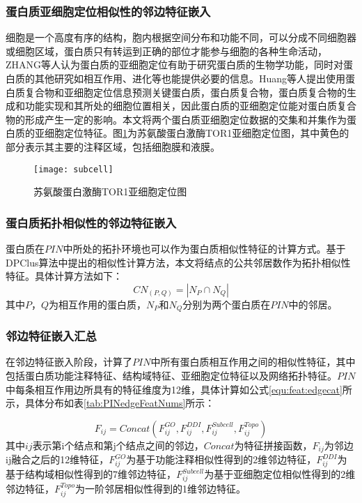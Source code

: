 \subsubsection{蛋白质亚细胞定位相似性的邻边特征嵌入}

细胞是一个高度有序的结构，胞内根据空间分布和功能不同，可以分成不同细胞器或细胞区域，蛋白质只有转运到正确的部位才能参与细胞的各种生命活动，ZHANG等人\cite{zhang_protein_2007}认为蛋白质的亚细胞定位有助于研究蛋白质的生物学功能，同时对蛋白质的其他研究如相互作用、进化等也能提供必要的信息。Huang等人提出\cite{fan_genome-wide_2017}使用蛋白质复合物和亚细胞定位信息预测关键蛋白质，蛋白质复合物，蛋白质复合物的生成和功能实现和其所处的细胞位置相关，因此蛋白质的亚细胞定位能对蛋白质复合物的形成产生一定的影响。本文将两个蛋白质亚细胞定位数据的交集和并集作为蛋白质的亚细胞定位特征。图\ref{fig:subcell}为苏氨酸蛋白激酶TOR1亚细胞定位图，其中黄色的部分表示其主要的注释区域，包括细胞膜和液膜。

\begin{figure}[htbp]
    \centering
    \texttt{[image: subcell]}
    \caption{苏氨酸蛋白激酶TOR1亚细胞定位图}
    \label{fig:subcell}
\end{figure}

\subsubsection{蛋白质拓扑相似性的邻边特征嵌入}

蛋白质在$PIN$中所处的拓扑环境也可以作为蛋白质相似性特征的计算方式。基于DPClus算法\cite{altaf-ul-amin_development_2006}中提出的相似性计算方法，本文将结点的公共邻居数作为拓扑相似性特征。具体计算方法如下：
\begin{equation}
    \label{equ:feat:topoCN}
    CN_{(P,Q)} = \left\lvert N_P\cap N_Q\right\rvert
\end{equation}
其中$P$，$Q$为相互作用的蛋白质，$N_P$和$N_Q$分别为两个蛋白质在$PIN$中的邻居。

\subsubsection{邻边特征嵌入汇总}

在邻边特征嵌入阶段，计算了$PIN$中所有蛋白质相互作用之间的相似性特征，其中包括蛋白质功能注释特征、结构域特征、亚细胞定位特征以及网络拓扑特征。$PIN$中每条相互作用边所具有的特征维度为12维，具体计算如公式\ref{equ:feat:edgecat}所示，具体分布如表\ref{tab:PINedgeFeatNums}所示：

\begin{equation}
    \label{equ:feat:edgecat}
    F_{ij}=Concat(F_{ij}^{GO},F_{ij}^{DDI},F_{ij}^{Subcell},F_{ij}^{Topo})
\end{equation}
其中${ij}$表示第i个结点和第j个结点之间的邻边，$Concat$为特征拼接函数，$F_{ij}$为邻边ij融合之后的12维特征，$F_{ij}^{GO}$为基于功能注释相似性得到的2维邻边特征，$F_{ij}^{DDI}$为基于结构域相似性得到的7维邻边特征，$F_{ij}^{Subcell}$为基于亚细胞定位相似性得到的2维邻边特征，$F_{ij}^{Topo}$为一阶邻居相似性得到的1维邻边特征。

